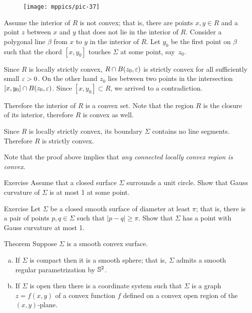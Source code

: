 \begin{wrapfigure}{o}{43 mm}
\vskip-0mm
\centering
\texttt{[image: mppics/pic-37]}
\vskip-0mm
\end{wrapfigure}

Assume the interior of $R$ is not convex; that is, there are points $x,y\in R$ and a point $z$ between $x$ and $y$ that does not lie in the interior of $R$.
Consider a polygonal  line $\beta$ from $x$ to $y$ in the interior of $R$.
Let $y_0$ be the first point on $\beta$ such that the chord $[x,y_0]$ touches $\Sigma$ at some point, say~$z_0$.

Since $R$ is locally strictly convex, $R\cap B(z_0,\varepsilon)$ is strictly convex for all sufficiently small $\varepsilon>0$.
On the other hand $z_0$ lies between two points in the intersection $[x,y_0]\cap B(z_0,\varepsilon)$.
Since $[x,y_0]\subset R$, we arrived to a contradiction.

Therefore the interior of $R$ is a convex set.
Note that the region $R$ is the closure of its interior, therefore $R$ is convex as well.

Since $R$ is locally strictly convex, its boundary $\Sigma$ contains no line segments.
Therefore $R$ is strictly convex.
\qeds

Note that the proof above implies that \emph{any connected locally convex region is convex}.

\begin{thm}{Exercise}\label{ex:surrounds-disc}
Assume that a closed surface $\Sigma$ surrounds a unit circle.
Show that Gauss curvature of $\Sigma$ is at most 1 at some point. 
\end{thm} 

\begin{thm}{Exercise}\label{ex:small-gauss}
Let $\Sigma$ be a closed smooth surface of diameter at least $\pi$;
that is, there is a pair of points $p,q\in\Sigma$ such that $|p-q|\ge \pi$.
Show that $\Sigma$ has a point with Gauss curvature at most 1.
\end{thm} 

\begin{thm}{Theorem}\label{thm:convex-proper}
Suppose $\Sigma$ is a smooth convex surface.

\begin{enumerate}[(a)]
\item\label{thm:convex-proper:sphere} If $\Sigma$ is compact then it is a smooth sphere; that is, $\Sigma$ admits a smooth regular parametrization by $\mathbb{S}^2$.
 
\item  If $\Sigma$ is open then there is a coordinate system such that 
$\Sigma$ is a graph $z=f(x,y)$ of a convex function $f$ defined on a convex open region of the $(x,y)$-plane.
\end{enumerate}

\end{thm}

